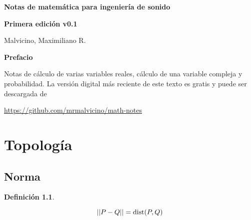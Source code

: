 \documentclass[a5paper,12pt,twoside]{book}
\newtheorem{defn}{{Definición}}[chapter]
\begin{document}
\pagestyle{fancy}
\fancyhf{}
\chead{\scriptsize \nouppercase\rightmark}
\cfoot{\scriptsize \thepage}
\renewcommand{\headrulewidth}{0pt}

\frontmatter
%

\begin{center}

    \begin{Huge}
    \textbf{Notas de matemática para ingeniería de sonido}
    \end{Huge}

    \vspace{1cm}
    \textbf{Primera edición v0.1}
    \vspace{2cm}

    \begin{Large}
        Malvicino, Maximiliano R.
    \end{Large}

\end{center}

\clearpage
\noindent
\textbf{Prefacio}

Notas de cálculo de varias variables reales, cálculo de una variable compleja y probabilidad.
La versión digital más reciente de este texto es gratis y puede ser descargada de
\begin{center}
    \small
    \url{https://github.com/mrmalvicino/math-notes}
\end{center}

\renewcommand{\spanishappendixname}{Anexo}
\tableofcontents

\mainmatter
{}


\chapter{Topología}


\section{Norma}

\begin{mdframed}[style=DefinitionFrame]
    \begin{defn}
    \end{defn}
    \begin{equation*}
        {\left|\left| {P-Q} \right|\right|} = \operatorname{dist} (P,Q)
    \end{equation*}
\end{mdframed}
\end{document}
